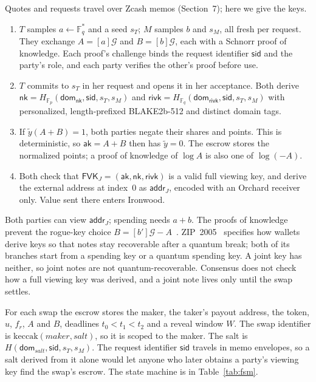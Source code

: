 \documentclass[10pt,letterpaper]{article}
\makeatletter
\renewcommand\subsection{\@startsection{subsection}{2}{\z@}{-0.9em}{0.25em}{\normalfont\normalsize\bfseries}}
\theoremstyle{plain}
\theoremstyle{definition}
\newcommand{\ak}{\mathsf{ak}}
\newcommand{\nk}{\mathsf{nk}}
\newcommand{\rivk}{\mathsf{rivk}}
\newcommand{\fvk}{\mathsf{FVK}}
\newcommand{\Gor}{\mathcal{G}}
\newcommand{\ytilde}{\tilde{y}}
\makeatother
\begin{document}
\subsection{Key setup}
Quotes and requests travel over Zcash memos (Section~7); here we give the keys.
\begin{enumerate}\setlength\itemsep{0.1em}
\item $T$ samples $a \leftarrow \mathbb{F}_q^*$ and a seed $s_T$; $M$ samples $b$ and $s_M$, all fresh
per request. They exchange $A=[a]\Gor$ and $B=[b]\Gor$, each with a Schnorr proof of knowledge.
Each proof's challenge binds the request identifier $\mathsf{sid}$ and the party's role, and each
party verifies the other's proof before use.
\item $T$ commits to $s_T$ in her request and opens it in her acceptance. Both derive
$\nk = H_{\mathbb{F}_p}(\mathsf{dom}_{\nk},\mathsf{sid},s_T,s_M)$ and
$\rivk = H_{\mathbb{F}_q}(\mathsf{dom}_{\rivk},\mathsf{sid},s_T,s_M)$ with personalized,
length-prefixed BLAKE2b-512 and distinct domain tags.
\item If $\ytilde(A+B)=1$, both parties negate their shares and points. This is deterministic, so
$\ak = A+B$ then has $\ytilde = 0$. The escrow stores the normalized points; a proof of knowledge
of $\log A$ is also one of $\log(-A)$.
\item Both check that $\fvk_J = (\ak,\nk,\rivk)$ is a valid full viewing key, and derive the
external address at index~0 as $\mathsf{addr}_J$, encoded with an Orchard receiver only. Value
sent there enters Ironwood.
\end{enumerate}
Both parties can view $\mathsf{addr}_J$; spending needs $a+b$. The proofs of knowledge prevent the
rogue-key choice $B = [b']\Gor - A$~\cite{musig}. ZIP~2005~\cite{zip2005} specifies how wallets
derive keys so that notes stay recoverable after a quantum break; both of its branches start from
a spending key or a quantum spending key. A joint key has neither, so joint notes are not
quantum-recoverable. Consensus does not check how a full viewing key was derived, and a joint
note lives only until the swap settles.

\subsection{Escrow}
For each swap the escrow stores the maker, the taker's payout address, the token, $u$, $f_r$, $A$
and $B$, deadlines $t_0 < t_1 < t_2$ and a reveal window $W$. The swap identifier is
$\mathrm{keccak}(\mathit{maker}, \mathit{salt})$, so it is scoped to the maker. The salt is
$H(\mathsf{dom}_{\mathit{salt}}, \mathsf{sid}, s_T, s_M)$. The request identifier $\mathsf{sid}$
travels in memo envelopes, so a salt derived from it alone would let anyone who later obtains a
party's viewing key find the swap's escrow. The state machine is in Table~\ref{tab:fsm}.
\end{document}
